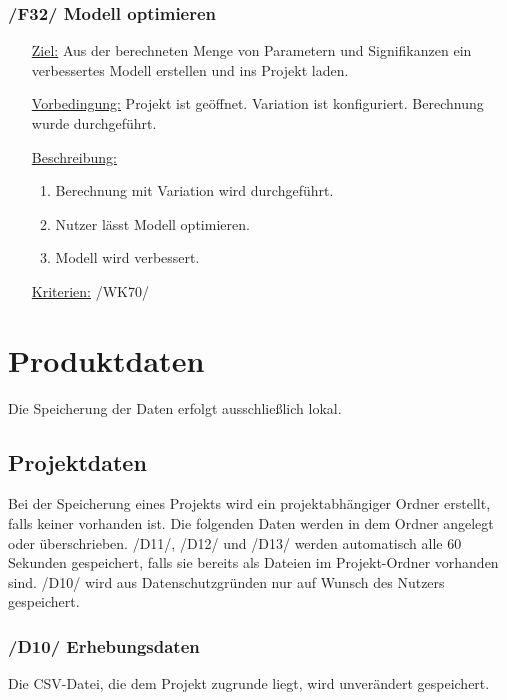 \documentclass{article}
\begin{document}
\subsubsection*{\textbf{/F32/} Modell optimieren}
\label{sec:f:Modell optimieren}
\begin{itemize}
    \item[\underline{Ziel:}] Aus der berechneten Menge von Parametern und Signifikanzen ein verbessertes Modell erstellen und ins Projekt laden.
    \item[\underline{Vorbedingung:}] Projekt ist geöffnet. Variation ist konfiguriert. Berechnung wurde durchgeführt.
    \item[\underline{Beschreibung:}]
    \begin{enumerate}
        \item Berechnung mit Variation wird durchgeführt.
        \item Nutzer lässt Modell optimieren.
        \item Modell wird verbessert.
    \end{enumerate}
    \item[\underline{Kriterien:}] /WK70/
\end{itemize}


\clearpage
\section{Produktdaten}
Die Speicherung der Daten erfolgt ausschließlich lokal.
\subsection{Projektdaten}
Bei der Speicherung eines Projekts wird ein projektabhängiger Ordner erstellt, falls keiner vorhanden ist. Die folgenden Daten werden in dem Ordner angelegt oder überschrieben. \newline
/D11/, /D12/ und /D13/ werden automatisch alle 60 Sekunden gespeichert, falls sie bereits als Dateien im Projekt-Ordner vorhanden sind.
/D10/ wird aus Datenschutzgründen nur auf Wunsch des Nutzers gespeichert.
\subsubsection*{\textbf{/D10/} Erhebungsdaten} \label{sec:dd:Erhebungsdaten}
Die CSV-Datei, die dem Projekt zugrunde liegt, wird unverändert gespeichert.
\end{document}
